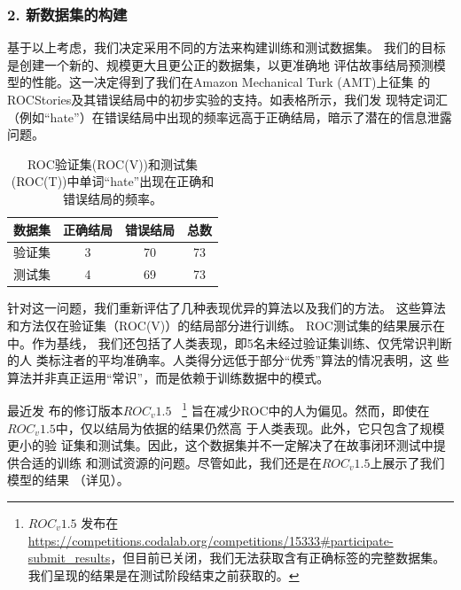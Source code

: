 \subsubsection*{2. 新数据集的构建}
基于以上考虑，我们决定采用不同的方法来构建训练和测试数据集。
我们的目标是创建一个新的、规模更大且更公正的数据集，以更准确地
评估故事结局预测模型的性能。这一决定得到了我们在Amazon Mechanical Turk (AMT)上征集
的ROCStories及其错误结局中的初步实验的支持。如表格所示，我们发
现特定词汇（例如``hate''）在错误结局中出现的频率远高于正确结局，暗示了潜在的信息泄露问题。
\begin{table}
  \small
  \centering
  \begin{tabular}{lccc}
  \toprule
  \textbf{数据集}& 正确结局& 错误结局 &总数\\
  \midrule
  验证集 & 3  & 70 &73\\
  测试集  & 4  & 69 &73\\
  \bottomrule
  \end{tabular}
  \caption{ROC验证集(ROC(V))和测试集(ROC(T))中单词``hate''出现在正确和错误结局的频率。}
  \label{tab2:hate}
  \end{table}

针对这一问题，我们重新评估了几种表现优异的算法以及我们的方法。
这些算法和方法仅在验证集（ROC(V)）的结局部分进行训练。
ROC测试集的结果展示在中。作为基线，
我们还包括了人类表现，即5名未经过验证集训练、仅凭常识判断的人
类标注者的平均准确率。人类得分远低于部分``优秀''算法的情况表明，这
些算法并非真正运用``常识''，而是依赖于训练数据中的模式。

最近发
布的修订版本$ROC_v1.5$~\cite{sharma2018tackling}
\footnote{$ROC_v1.5$ 发布在\url{https://competitions.codalab.org/competitions/15333\#participate-submit\_results}，但目前已关闭，我们无法获取含有正确标签的完整数据集。我们呈现的结果是在测试阶段结束之前获取的。}
旨在减少ROC中的人为偏见。然而，即使在$ROC_v1.5$中，仅以结局为依据的结果仍然高
于人类表现\cite{sharma2018tackling}。此外，它只包含了规模更小的验
证集和测试集。因此，这个数据集并不一定解决了在故事闭环测试中提供合适的训练
和测试资源的问题。尽管如此，我们还是在$ROC_v1.5$上展示了我们模型的结果
（详见）。

